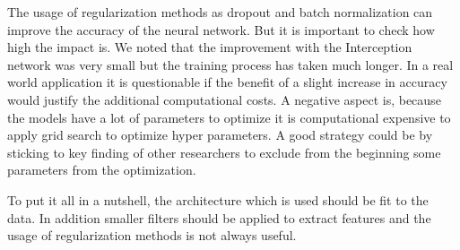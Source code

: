 \documentclass[11pt, a4paper]{article}
\begin{document}
The usage of regularization methods as dropout and batch normalization can improve the accuracy of the neural network. But it is important to check how high the impact is. We noted that the improvement with the Interception network was very small but the training process has taken much longer. In a real world application it is questionable if the benefit of a slight increase in accuracy would justify the additional computational costs. A negative aspect is, because the models have a lot of parameters to optimize it is computational expensive to apply grid search to optimize hyper parameters. A good strategy could be by sticking to key finding of other researchers to exclude from the beginning some parameters from the optimization. 

To put it all in a nutshell, the architecture which is used should be fit to the data. In addition smaller filters should be applied to extract features and the usage of regularization methods is not always useful.

 

\end{document}
